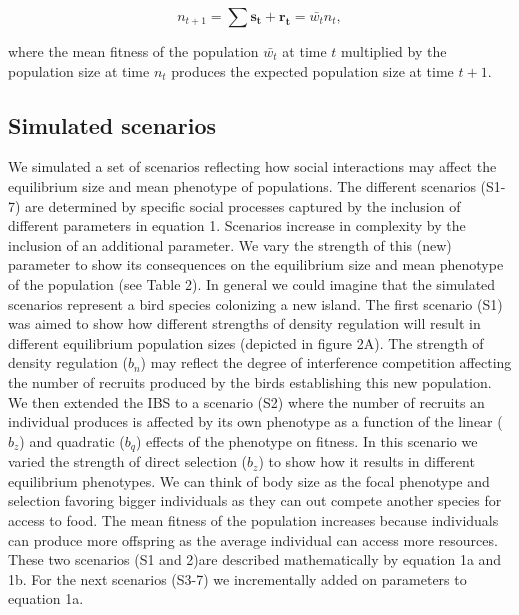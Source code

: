 \documentclass{article}
\begin{document}
\begin{equation}
n_{t+1}=\sum \mathbf{s_{t}} + \mathbf{r_{t}}=\bar{w_{t}}n_{t}, 
\end{equation}

\noindent where the mean fitness of the population $\bar{w_{t}}$ at time $t$  multiplied by the population size at time $n_{t}$ produces the expected population size at time $t + 1$. 

 
\subsection{Simulated scenarios}
We simulated a set of scenarios reflecting how social interactions may affect the equilibrium size and mean phenotype of populations. The different scenarios (S1-7) are determined by specific social processes captured by the inclusion of different parameters in equation 1. Scenarios increase in complexity by the inclusion of an additional parameter. We vary the strength of this (new) parameter to show its consequences on the equilibrium size and mean phenotype of the population (see Table 2). In general we could imagine that the simulated scenarios represent a bird species colonizing a new island. The first scenario (S1) was aimed to show how different strengths of density regulation will result in different equilibrium population sizes (depicted in figure 2A). The strength of density regulation ($b_n$) may reflect the degree of interference competition affecting the number of recruits produced by the birds establishing this new population. We then extended the IBS to a scenario (S2) where the number of recruits an individual produces is affected by its own phenotype as a function of the linear ($b_z$) and quadratic ($b_q$) effects of the phenotype on fitness. In this scenario we varied the strength of direct selection ($b_z$) to show how it results in different equilibrium phenotypes. We can think of body size as the focal phenotype and selection favoring bigger individuals as they can out compete another species for access to food. The mean fitness of the population increases because individuals can produce more offspring as the average individual can access more resources. These two scenarios (S1 and 2)are described mathematically by equation 1a and 1b. For the next scenarios (S3-7) we incrementally added on parameters to equation 1a.
\end{document}
